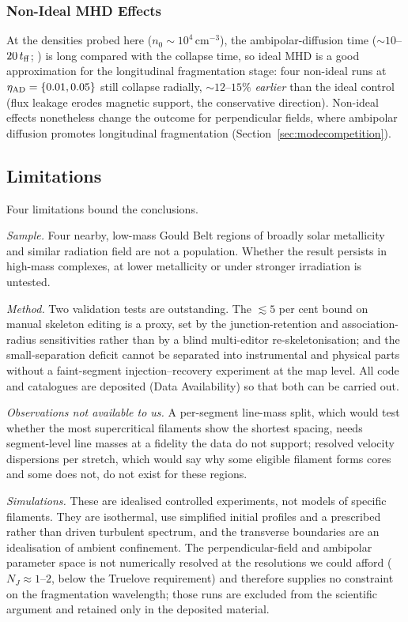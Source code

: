 \documentclass[usenatbib,twoside,twocolumn]{mnras}
\begin{document}
\subsubsection{Non-Ideal MHD Effects}
\label{sec:nonideal}

At the densities probed here ($n_0\sim10^4$\,cm$^{-3}$), the ambipolar-diffusion time ($\sim10$--$20\,t_{\rm ff}$; \citealt{Tassis2004}) is long compared with the collapse time, so ideal MHD is a good approximation for the longitudinal fragmentation stage: four non-ideal runs at $\eta_{\rm AD}=\{0.01,0.05\}$ still collapse radially, $\sim12$--$15\%$ \textit{earlier} than the ideal control (flux leakage erodes magnetic support, the conservative direction). Non-ideal effects nonetheless change the outcome for perpendicular fields, where ambipolar diffusion promotes longitudinal fragmentation (Section~\ref{sec:modecompetition}).

\subsection{Limitations}
\label{sec:limitations}

Four limitations bound the conclusions.

\emph{Sample.} Four nearby, low-mass Gould Belt regions of broadly solar metallicity and similar radiation field are not a population. Whether the result persists in high-mass complexes, at lower metallicity or under stronger irradiation is untested.

\emph{Method.} Two validation tests are outstanding. The $\lesssim5$ per cent bound on manual skeleton editing is a proxy, set by the junction-retention and association-radius sensitivities rather than by a blind multi-editor re-skeletonisation; and the small-separation deficit cannot be separated into instrumental and physical parts without a faint-segment injection--recovery experiment at the map level. All code and catalogues are deposited (Data Availability) so that both can be carried out.

\emph{Observations not available to us.} A per-segment line-mass split, which would test whether the most supercritical filaments show the shortest spacing, needs segment-level line masses at a fidelity the data do not support; resolved velocity dispersions per stretch, which would say why some eligible filament forms cores and some does not, do not exist for these regions.

\emph{Simulations.} These are idealised controlled experiments, not models of specific filaments. They are isothermal, use simplified initial profiles and a prescribed rather than driven turbulent spectrum, and the transverse boundaries are an idealisation of ambient confinement. The perpendicular-field and ambipolar parameter space is not numerically resolved at the resolutions we could afford ($N_J\approx1$--$2$, below the Truelove requirement) and therefore supplies no constraint on the fragmentation wavelength; those runs are excluded from the scientific argument and retained only in the deposited material.
\end{document}
